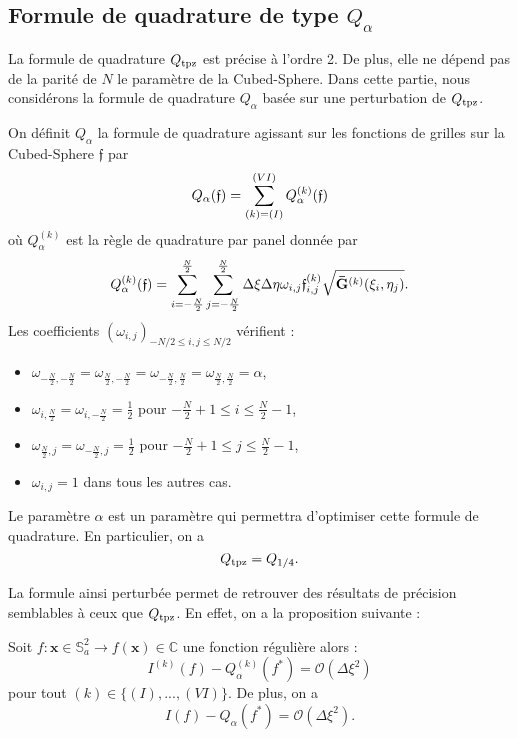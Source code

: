 \subsection{Formule de quadrature de type $Q_{\alpha}$}

La formule de quadrature $Q_{\text{tpz}}$ est précise à l'ordre 2. De plus, elle ne dépend pas de la parité de $N$ le paramètre de la Cubed-Sphere. Dans cette partie, nous considérons la formule de quadrature $Q_{\alpha}$ basée sur une perturbation de $Q_{\text{tpz}}$.
\begin{definition}
On définit $Q_{\alpha}$ la formule de quadrature agissant sur les fonctions de grilles sur la Cubed-Sphere $\mathfrak{f}$ par
\begin{equation}
Q_{\alpha}(\mathfrak{f})= \displaystyle\sum\limits_{(k)=(I)}^{(VI)} Q^{(k)}_{\alpha}(\mathfrak{f})
\end{equation}
où $Q^{(k)}_{\alpha}$ est la règle de quadrature par panel donnée par
\begin{equation}
Q_{\alpha}^{(k)}(\mathfrak{f})=\displaystyle\sum\limits_{i = -\frac{N}{2}}^{\frac{N}{2}}\displaystyle\sum\limits_{j = -\frac{N}{2}}^{\frac{N}{2}} \Delta \xi \Delta \eta \omega_{i,j} \mathfrak{f}_{i,j}^{(k)} \sqrt{\mathbf{\bar{G}}^{(k)}(\xi_i, \eta_j)}.
\label{eq:alpha par panel}
\end{equation}
Les coefficients $(\omega_{i,j})_{-N/2 \leq i,j \leq N/2}$ vérifient :
\begin{itemize}
\item $\omega_{-\frac{N}{2},-\frac{N}{2}}=\omega_{\frac{N}{2},-\frac{N}{2}}=\omega_{-\frac{N}{2},\frac{N}{2}}=\omega_{\frac{N}{2},\frac{N}{2}}=\alpha$,
\item $\omega_{i,\frac{N}{2}}=\omega_{i,-\frac{N}{2}}=\frac{1}{2}$ pour $-\frac{N}{2}+1 \leq i \leq \frac{N}{2}-1$,
\item $\omega_{\frac{N}{2},j}=\omega_{-\frac{N}{2},j}=\frac{1}{2}$ pour $-\frac{N}{2}+1 \leq j \leq \frac{N}{2}-1$,
\item $\omega_{i,j}=1$ dans tous les autres cas.
\end{itemize}
\end{definition} 

Le paramètre $\alpha$ est un paramètre qui permettra d'optimiser cette formule de quadrature.
En particulier, on a
\begin{equation}
Q_{\text{tpz}} = Q_{1/4}.
\end{equation}

La formule ainsi perturbée permet de retrouver des résultats de précision semblables à ceux que $Q_{\text{tpz}}$. En effet, on a la proposition suivante :
\begin{proposition}
Soit $f: \mathbf{x} \in \mathbb{S}_a^2 \rightarrow f(\mathbf{x}) \in \mathbb{C}$ une fonction régulière alors :
\begin{equation}
I^{(k)}(f) - Q^{(k)}_{\alpha}(f^*) = \mathcal{O} \left( \Delta \xi^2 \right)
\end{equation}
pour tout $(k) \in \lbrace (I), ..., (VI) \rbrace$.
De plus, on a
\begin{equation}
I(f) - Q_{\alpha}(f^*) = \mathcal{O}(\Delta \xi^2).
\end{equation}
\label{prop:consistance alpha panel}
\end{proposition}

